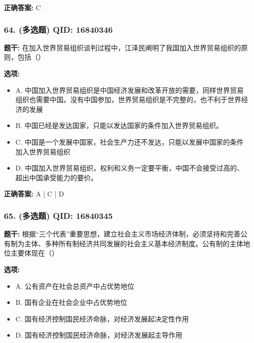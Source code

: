 \documentclass[12pt,UTF8]{ctexart}
\begin{document}
\textbf{正确答案:}
C

\vspace{0.3em}\hrulefill\vspace{0.7em}

\subsubsection*{64. (多选题) \small QID: 16840346}

\textbf{题干:}
在加入世界贸易组织谈判过程中，江泽民阐明了我国加入世界贸易组织的原则，包括（）

\textbf{选项:}
\begin{itemize}[leftmargin=*]

  \item A. 中国加入世界贸易组织是中国经济发展和改革开放的需要，同样世界贸易组织也需要中国。没有中国参加，世界贸易组织是不完整的，也不利于世界经济的发展

  \item B. 中国已经是发达国家，只能以发达国家的条件加入世界贸易组织。

  \item C. 中国是一个发展中国家，社会生产力还不发达，只能以发展中国家的条件加入世界贸易组织

  \item D. 中国加入世界贸易组织，权利和义务一定要平衡，中国不会接受过高的、超出中国承受能力的要价。

\end{itemize}

\textbf{正确答案:}
A | C | D

\vspace{0.3em}\hrulefill\vspace{0.7em}

\subsubsection*{65. (多选题) \small QID: 16840345}

\textbf{题干:}
根据“三个代表”重要思想，建立社会主义市场经济体制，必须坚持和完善公有制为主体、多种所有制经济共同发展的社会主义基本经济制度。公有制的主体地位主要体现在（）

\textbf{选项:}
\begin{itemize}[leftmargin=*]

  \item A. 公有资产在社会总资产中占优势地位

  \item B. 国有企业在社会企业中占优势地位

  \item C. 国有经济控制国民经济命脉，对经济发展起决定性作用

  \item D. 国有经济控制国民经济命脉，对经济发展起主导作用

\end{itemize}
\end{document}
